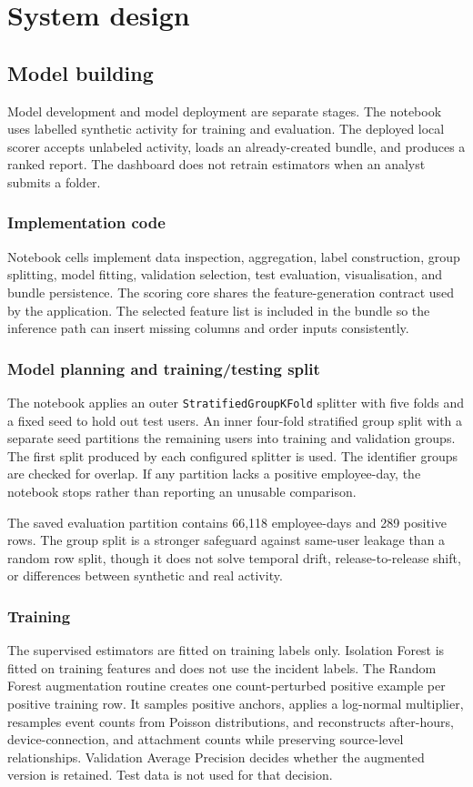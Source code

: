 \documentclass[12pt,a4paper,oneside]{report}
\newcommand{\code}[1]{\texttt{\small #1}}
\begin{document}
\chapter{System design}
\label{chap:design}

\section{Model building}
Model development and model deployment are separate stages. The
notebook uses labelled synthetic activity for training and
evaluation. The deployed local scorer accepts unlabeled activity,
loads an already-created bundle, and produces a ranked report. The
dashboard does not retrain estimators when an analyst submits a folder.

\subsection{Implementation code}
Notebook cells implement data inspection, aggregation, label
construction, group splitting, model fitting, validation selection,
test evaluation, visualisation, and bundle persistence. The scoring
core shares the feature-generation contract used by the application.
The selected feature list is included in the bundle so the inference
path can insert missing columns and order inputs consistently.

\subsection{Model planning and training/testing split}
The notebook applies an outer \code{StratifiedGroupKFold} splitter with
five folds and a fixed seed to hold out test users. An inner
four-fold stratified group split with a separate seed partitions the
remaining users into training and validation groups. The first
split produced by each configured splitter is used. The identifier
groups are checked for overlap. If any partition lacks a positive
employee-day, the notebook stops rather than reporting an unusable
comparison.

The saved evaluation partition contains 66,118 employee-days and 289
positive rows. The group split is a stronger safeguard against
same-user leakage than a random row split, though it does not solve
temporal drift, release-to-release shift, or differences between
synthetic and real activity.

\subsection{Training}
The supervised estimators are fitted on training labels only.
Isolation Forest is fitted on training features and does not use the
incident labels. The Random Forest augmentation routine creates one
count-perturbed positive example per positive training row. It samples
positive anchors, applies a log-normal multiplier, resamples event
counts from Poisson distributions, and reconstructs after-hours,
device-connection, and attachment counts while preserving
source-level relationships. Validation Average Precision decides
whether the augmented version is retained. Test data is not used for
that decision.
\end{document}
